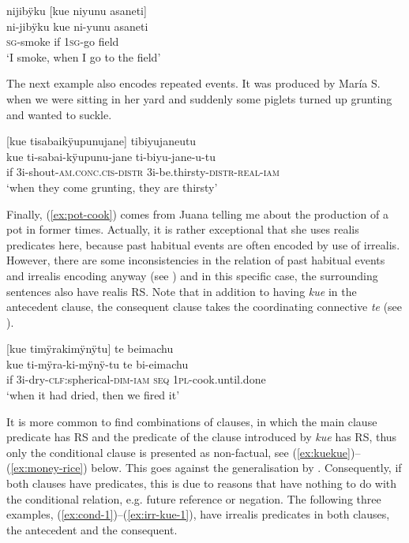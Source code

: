\ea\label{ex:TempAdv-kue-1}
\begingl
\glpreamble nijibÿku \textup{[}kue niyunu asaneti\textup{]}\\
\gla ni-jibÿku kue ni-yunu asaneti\\
\textsc{sg}-smoke if 1\textsc{sg}-go field\\
\glft ‘I smoke, when I go to the field’
\endgl
\trailingcitation{[rxx-e120511l.391]}%
\xe

The next example also encodes repeated events. It was produced by María S. when we were sitting in her yard and suddenly some piglets turned up grunting and wanted to suckle.

\ea\label{ex:real-kue-1}
\begingl
\glpreamble \textup{[}kue tisabaikÿupunujane\textup{]} tibiyujaneutu\\
\gla kue ti-sabai-kÿupunu-jane ti-biyu-jane-u-tu\\
\glb if 3i-shout-\textsc{am.conc.cis}-\textsc{distr} 3i-be.thirsty-\textsc{distr}-\textsc{real}-\textsc{iam}\\
\glft ‘when they come grunting, they are thirsty’
\endgl
\trailingcitation{[rmx-e150922l.157]}
\xe

Finally, (\ref{ex:pot-cook}) comes from Juana telling me about the production of a pot in former times. Actually, it is rather exceptional that she uses realis predicates here, because past habitual events are often encoded by use of irrealis. However, there are some inconsistencies in the relation of past habitual events and irrealis encoding anyway (see ) and in this specific case, the surrounding sentences also have realis RS. Note that in addition to having \textit{kue} in the antecedent clause, the consequent clause takes the coordinating  connective \textit{te} (see ).


\ea\label{ex:pot-cook}
\begingl
\glpreamble \textup{[}kue timÿrakimÿnÿtu\textup{]} te beimachu\\
\gla kue ti-mÿra-ki-mÿnÿ-tu te bi-eimachu\\
\glb if 3i-dry-\textsc{clf:}spherical-\textsc{dim}-\textsc{iam} \textsc{seq} 1\textsc{pl}-cook.until.done\\
\glft ‘when it had dried, then we fired it’
\endgl
\trailingcitation{[jxx-d110923l-2.21]}
\xe

It is more common to find combinations of clauses, in which the main clause predicate has  RS and the predicate of the clause introduced by \textit{kue} has  RS, thus only the conditional clause is presented as non-factual, see (\ref{ex:kuekue})–(\ref{ex:money-rice}) below. This goes against the generalisation by \citet[160--161]{Cristofaro2003}. Consequently, if  both clauses have  predicates, this is due to reasons that have nothing to do with the conditional relation, e.g. future reference or negation. The following three examples, (\ref{ex:cond-1})–(\ref{ex:irr-kue-1}), have irrealis predicates in both clauses, the antecedent and the consequent.

